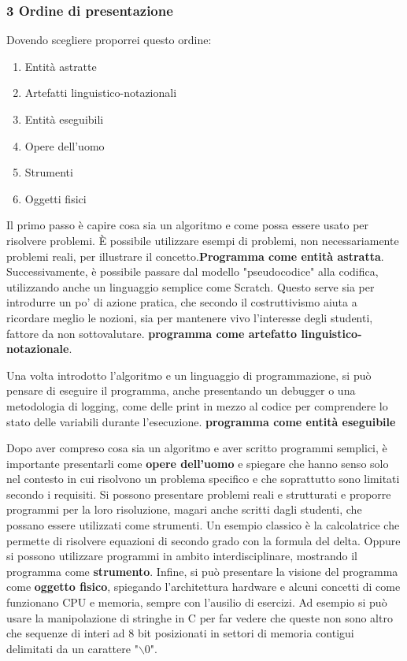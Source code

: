 \documentclass[a4paper]{article}
\begin{document}
\subsubsection{3 Ordine di presentazione}
Dovendo scegliere proporrei questo ordine:
\begin{enumerate}
	\item Entità astratte
	\item Artefatti linguistico-notazionali
	\item Entità eseguibili
	\item Opere dell'uomo
	\item Strumenti
	\item Oggetti fisici
\end{enumerate}
Il primo passo è capire cosa sia un algoritmo e come possa essere usato per risolvere problemi. È possibile utilizzare esempi di problemi, non necessariamente problemi reali, per illustrare il concetto.\textbf{Programma come entità astratta}.
Successivamente, è possibile passare dal modello "pseudocodice" alla codifica, utilizzando anche un linguaggio semplice come Scratch. Questo serve sia per introdurre un po' di azione pratica, che secondo il costruttivismo aiuta a ricordare meglio le nozioni, sia per mantenere vivo l'interesse degli studenti, fattore da non sottovalutare. \textbf{programma come artefatto linguistico-notazionale}.

Una volta introdotto l'algoritmo e un linguaggio di programmazione, si può pensare di eseguire il programma, anche presentando un debugger o una metodologia di logging, come delle print in mezzo al codice per comprendere lo stato delle variabili durante l'esecuzione. \textbf{programma come entità eseguibile}

Dopo aver compreso cosa sia un algoritmo e aver scritto programmi semplici, è importante presentarli come \textbf{opere dell'uomo} e spiegare che hanno senso solo nel contesto in cui risolvono un problema specifico e che soprattutto sono limitati secondo i requisiti.
Si possono presentare problemi reali e strutturati e proporre programmi per la loro risoluzione, magari anche scritti dagli studenti, che possano essere utilizzati come strumenti.
Un esempio classico è la calcolatrice che permette di risolvere equazioni di secondo grado con la formula del delta. Oppure si possono utilizzare programmi in ambito interdisciplinare, mostrando il programma come \textbf{strumento}.
Infine, si può presentare la visione del programma come \textbf{oggetto fisico}, spiegando l'architettura hardware e alcuni concetti di come funzionano CPU e memoria, sempre con l'ausilio di esercizi.
Ad esempio si può usare la manipolazione di stringhe in C per far vedere che queste non sono altro che sequenze di interi ad 8 bit posizionati in settori di memoria contigui delimitati da un carattere "$\backslash$0".
\end{document}
